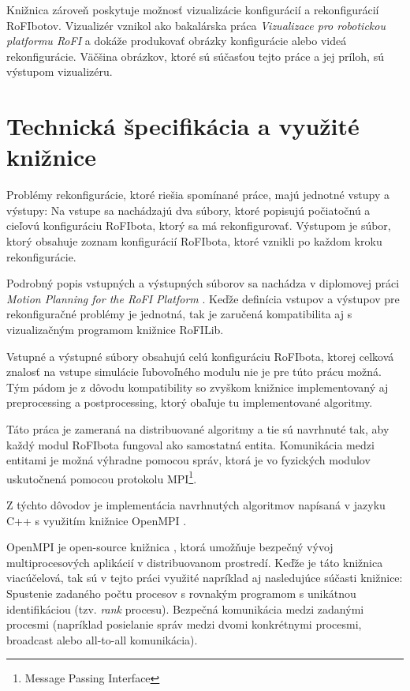 \documentclass[
  digital, %
  oneside, %
  table,   %
  lof,     %
  nolot,     %
]{fithesis3}
\begin{document}
Knižnica zároveň poskytuje možnosť vizualizácie konfigurácií a rekonfigurácií RoFIbotov. Vizualizér vznikol ako bakalárska práca \textit{Vizualizace pro robotickou platformu RoFI} \cite{nausovaBachelorThesis} a dokáže produkovať obrázky konfigurácie alebo videá rekonfigurácie. Väčšina obrázkov, ktoré sú súčasťou tejto práce a jej príloh, sú výstupom vizualizéru. 

\section{Technická špecifikácia a využité knižnice}
\label{sec:libraries}
Problémy rekonfigurácie, ktoré riešia spomínané práce, majú jednotné vstupy a výstupy: Na vstupe sa nachádzajú dva súbory, ktoré popisujú počiatočnú a cieľovú konfiguráciu RoFIbota, ktorý sa má rekonfigurovať. Výstupom je súbor, ktorý obsahuje zoznam konfigurácií RoFIbota, ktoré vznikli po každom kroku rekonfigurácie. 

Podrobný popis vstupných a výstupných súborov sa nachádza v diplomovej práci \textit{Motion Planning for the RoFI Platform} \cite{vozarovaMasterThesis}. Keďže definícia vstupov a výstupov pre rekonfiguračné problémy je jednotná, tak je zaručená kompatibilita aj s vizualizačným programom knižnice RoFILib. 

Vstupné a výstupné súbory obsahujú celú konfiguráciu RoFIbota, ktorej celková znalosť na vstupe simulácie ľubovoľného modulu nie je pre túto prácu možná. Tým pádom je z dôvodu kompatibility so zvyškom knižnice implementovaný aj preprocessing a postprocessing, ktorý obaľuje tu implementované algoritmy. 

Táto práca je zameraná na distribuované algoritmy a tie sú navrhnuté tak, aby každý modul RoFIbota fungoval ako samostatná entita. Komunikácia medzi entitami je možná výhradne pomocou správ, ktorá je vo fyzických modulov uskutočnená pomocou protokolu MPI\footnote{Message Passing Interface}. 

Z týchto dôvodov je implementácia navrhnutých algoritmov napísaná v jazyku C++ s využitím knižnice OpenMPI \cite{openMPILibrary}. 

OpenMPI je open-source knižnica \cite{openMPIGit}, ktorá umožňuje bezpečný vývoj multiprocesových aplikácií v distribuovanom prostredí. Keďže je táto knižnica viacúčelová, tak sú v tejto práci využité napríklad aj nasledujúce súčasti knižnice: Spustenie zadaného počtu procesov s rovnakým programom s unikátnou identifikáciou (tzv. \textit{rank} procesu). Bezpečná komunikácia medzi zadanými procesmi (napríklad posielanie správ medzi dvomi konkrétnymi procesmi, broadcast alebo all-to-all komunikácia). 
\end{document}
